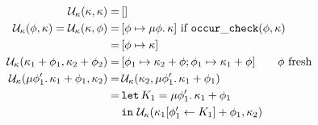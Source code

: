 \documentclass[9pt,preprint]{sigplanconf}
\begin{document}
\begin{small}
\begin{align*}
\mathcal{U}_{\kappa}(\kappa, \kappa) =&\, [] \\
\mathcal{U}_{\kappa}(\phi, \kappa) = \mathcal{U}_{\kappa}(\kappa, \phi) =
					&\, [\phi \mapsto  \mu \phi.\, \kappa ]  \text{ if } \mathtt{occur\_check}(\phi, \kappa) \\
					= &\,  [\phi \mapsto \kappa] \\
\mathcal{U}_{\kappa}(\kappa_1 + \phi_1, \kappa_2 + \phi_2) =&\,
                  [\phi_1 \mapsto \kappa_2 + \phi;  \phi_1 \mapsto \kappa_1 + \phi ]  \qquad \phi \text{ fresh} \\
\mathcal{U}_{\kappa}(\mu \phi'_1.\, \kappa_1 + \phi_1, \kappa_2) 
    = &\, \mathcal{U}_{\kappa}(\kappa_2, \mu \phi'_1.\, \kappa_1 + \phi_1) \\ 
    = &\, \mathtt{let}\, K_1 = \mu \phi'_1.\, \kappa_1 + \phi_1 \\
    &\, \mathtt{in}\,\, \mathcal{U}_{\kappa}( \kappa_1[\phi'_1 \leftarrow K_1] + \phi_1 , \kappa_2) \\
\end{align*}
\end{small}
\end{document}
